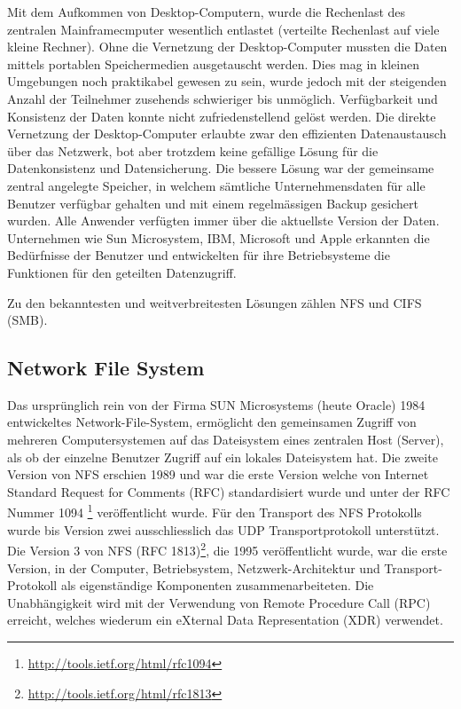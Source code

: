 Mit dem Aufkommen von Desktop-Computern, wurde die Rechenlast des zentralen Mainframecmputer wesentlich entlastet (verteilte Rechenlast auf viele kleine Rechner). Ohne die Vernetzung der Desktop-Computer mussten die Daten mittels portablen Speichermedien ausgetauscht werden. Dies mag in kleinen Umgebungen noch praktikabel gewesen zu sein, wurde jedoch mit der steigenden Anzahl der Teilnehmer zusehends schwieriger bis unmöglich. Verfügbarkeit und Konsistenz der Daten konnte nicht zufriedenstellend gelöst werden. Die direkte Vernetzung der Desktop-Computer erlaubte zwar den effizienten Datenaustausch über das Netzwerk, bot aber trotzdem keine gefällige Lösung für die Datenkonsistenz und Datensicherung. Die bessere Lösung war der gemeinsame zentral angelegte Speicher, in welchem sämtliche Unternehmensdaten für alle Benutzer verfügbar gehalten und mit einem regelmässigen Backup gesichert wurden. Alle Anwender verfügten immer über die aktuellste Version der Daten. Unternehmen wie Sun Microsystem, IBM, Microsoft und Apple erkannten die Bedürfnisse der Benutzer und entwickelten für ihre Betriebsysteme die Funktionen für den geteilten Datenzugriff.

Zu den bekanntesten und weitverbreitesten Lösungen zählen NFS und \gls{CIFS} (SMB).


\subsection{Network File System}
Das ursprünglich rein von der Firma SUN Microsystems (heute Oracle) 1984 entwickeltes Network-File-System, ermöglicht den gemeinsamen Zugriff von mehreren Computersystemen auf das Dateisystem eines zentralen Host (Server), als ob der einzelne Benutzer Zugriff auf ein lokales Dateisystem hat. Die zweite Version von NFS erschien 1989 und war die erste Version welche von Internet Standard Request for Comments (\gls{RFC}) standardisiert wurde und unter der \gls{RFC} Nummer 1094 \footnote{\url{http://tools.ietf.org/html/rfc1094}} veröffentlicht wurde. Für den Transport des NFS Protokolls wurde bis Version zwei ausschliesslich das \gls{UDP} Transportprotokoll unterstützt.
Die Version 3 von NFS (\gls{RFC} 1813)\footnote{\url{http://tools.ietf.org/html/rfc1813}}, die 1995 veröffentlicht wurde, war die erste Version, in der Computer, Betriebsystem, Netzwerk-Architektur und Transport-Protokoll als eigenständige Komponenten zusammenarbeiteten. Die Unabhängigkeit wird mit der Verwendung von Remote Procedure Call (\gls{RPC}) erreicht, welches wiederum ein eXternal Data Representation (\gls{XDR}) verwendet. \cite{Stern2001}

